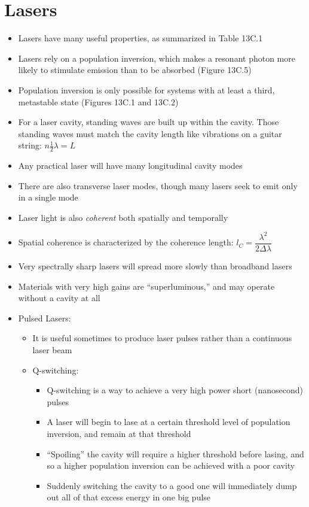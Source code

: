 \documentclass[12pt, openany, letterpaper]{memoir}
\begin{document}
\section{Lasers}
\begin{itemize}
	\item Lasers have many useful properties, as summarized in Table 13C.1
	\item Lasers rely on a population inversion, which makes a resonant photon more likely to stimulate emission than to be absorbed (Figure 13C.5)
	\item Population inversion is only possible for systems with at least a third, metastable state (Figures 13C.1 and 13C.2)
	\item For a laser cavity, standing waves are built up within the cavity. Those standing waves must match the cavity length like vibrations on a guitar string: $n\frac{1}{2}\lambda=L$
	\item Any practical laser will have many longitudinal cavity modes
	\item There are also transverse laser modes, though many lasers seek to emit only in a single mode
	\item Laser light is also \emph{coherent} both spatially and temporally
	\item Spatial coherence is characterized by the coherence length: $l_C=\dfrac{\lambda^2}{2\Delta \lambda}$
	\item Very spectrally sharp lasers will spread more slowly than broadband lasers
	\item Materials with very high gains are ``superluminous,'' and may operate without a cavity at all
	\item Pulsed Lasers:
	\begin{itemize}
		\item It is useful sometimes to produce laser pulses rather than a continuous laser beam
		\item Q-switching:
		\begin{itemize}
			\item Q-switching is a way to achieve a very high power short (nanosecond) pulses
			\item A laser will begin to lase at a certain threshold level of population inversion, and remain at that threshold
			\item “Spoiling” the cavity will require a higher threshold before lasing, and so a higher population inversion can be achieved with a poor cavity
			\item Suddenly switching the cavity to a good one will immediately dump out all of that excess energy in one big pulse

\end{itemize}
\end{itemize}
\end{itemize}
\end{document}
